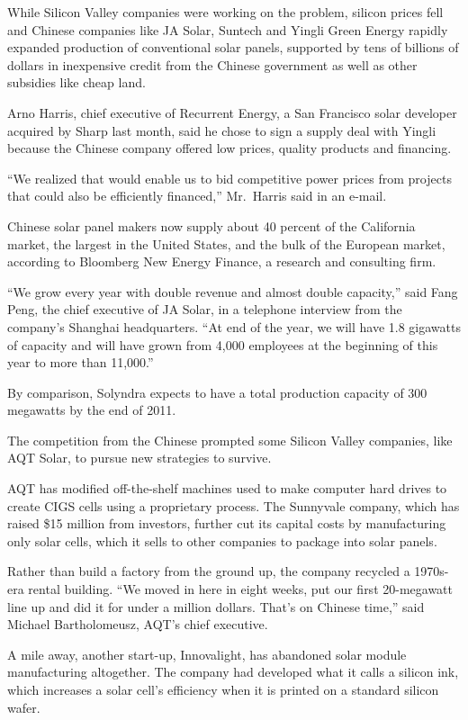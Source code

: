 ﻿\documentclass[12pt]{article}
\begin{document}
While Silicon Valley companies were working on the problem, silicon prices fell and Chinese
companies like JA Solar, Suntech and Yingli Green Energy rapidly expanded production of conventional
solar panels, supported by tens of billions of dollars in inexpensive credit from the Chinese
government as well as other subsidies like cheap land.

Arno Harris, chief executive of Recurrent Energy, a San Francisco solar developer acquired by Sharp
last month, said he chose to sign a supply deal with Yingli because the Chinese company offered low
prices, quality products and financing.

``We realized that would enable us to bid competitive power prices from projects that could also be
efficiently financed,'' Mr.~Harris said in an e-mail.

Chinese solar panel makers now supply about 40 percent of the California market, the largest in the
United States, and the bulk of the European market, according to Bloomberg New Energy Finance, a
research and consulting firm.

``We grow every year with double revenue and almost double capacity,'' said Fang Peng, the chief
executive of JA Solar, in a telephone interview from the company's Shanghai headquarters. ``At end
of the year, we will have 1.8 gigawatts of capacity and will have grown from 4,000 employees at the
beginning of this year to more than 11,000.''

By comparison, Solyndra expects to have a total production capacity of 300 megawatts by the end of
2011.

The competition from the Chinese prompted some Silicon Valley companies, like AQT Solar, to pursue
new strategies to survive.

AQT has modified off-the-shelf machines used to make computer hard drives to create CIGS cells using
a proprietary process. The Sunnyvale company, which has raised \$15 million from investors, further
cut its capital costs by manufacturing only solar cells, which it sells to other companies to
package into solar panels.

Rather than build a factory from the ground up, the company recycled a 1970s-era rental building.
``We moved in here in eight weeks, put our first 20-megawatt line up and did it for under a million
dollars. That's on Chinese time,'' said Michael Bartholomeusz, AQT's chief executive.

A mile away, another start-up, Innovalight, has abandoned solar module manufacturing altogether. The
company had developed what it calls a silicon ink, which increases a solar cell's efficiency when it
is printed on a standard silicon wafer.
\end{document}
